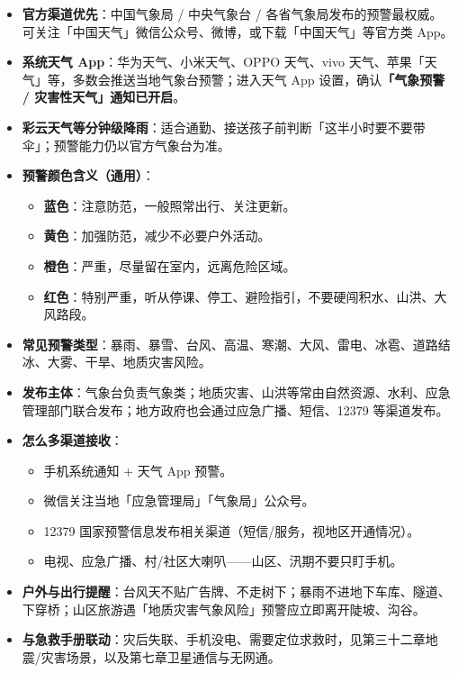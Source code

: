 \begin{itemize}
  \item \textbf{官方渠道优先}：中国气象局 / 中央气象台 / 各省气象局发布的预警最权威。可关注「中国天气」微信公众号、微博，或下载「中国天气」等官方类 App。
  \item \textbf{系统天气 App}：华为天气、小米天气、OPPO 天气、vivo 天气、苹果「天气」等，多数会推送当地气象台预警；进入天气 App 设置，确认\textbf{「气象预警 / 灾害性天气」通知已开启}。
  \item \textbf{彩云天气等分钟级降雨}：适合通勤、接送孩子前判断「这半小时要不要带伞」；预警能力仍以官方气象台为准。
  \item \textbf{预警颜色含义（通用）}：
  \begin{itemize}
    \item \textbf{蓝色}：注意防范，一般照常出行、关注更新。
    \item \textbf{黄色}：加强防范，减少不必要户外活动。
    \item \textbf{橙色}：严重，尽量留在室内，远离危险区域。
    \item \textbf{红色}：特别严重，听从停课、停工、避险指引，不要硬闯积水、山洪、大风路段。
  \end{itemize}
  \item \textbf{常见预警类型}：暴雨、暴雪、台风、高温、寒潮、大风、雷电、冰雹、道路结冰、大雾、干旱、地质灾害风险。
\end{itemize}


\begin{itemize}
  \item \textbf{发布主体}：气象台负责气象类；地质灾害、山洪等常由自然资源、水利、应急管理部门联合发布；地方政府也会通过应急广播、短信、12379 等渠道发布。
  \item \textbf{怎么多渠道接收}：
  \begin{itemize}
    \item 手机系统通知 + 天气 App 预警。
    \item 微信关注当地「应急管理局」「气象局」公众号。
    \item 12379 国家预警信息发布相关渠道（短信/服务，视地区开通情况）。
    \item 电视、应急广播、村/社区大喇叭——山区、汛期不要只盯手机。
  \end{itemize}
  \item \textbf{户外与出行提醒}：台风天不贴广告牌、不走树下；暴雨不进地下车库、隧道、下穿桥；山区旅游遇「地质灾害气象风险」预警应立即离开陡坡、沟谷。
  \item \textbf{与急救手册联动}：灾后失联、手机没电、需要定位求救时，见第三十二章地震/灾害场景，以及第七章卫星通信与无网通。
\end{itemize}

